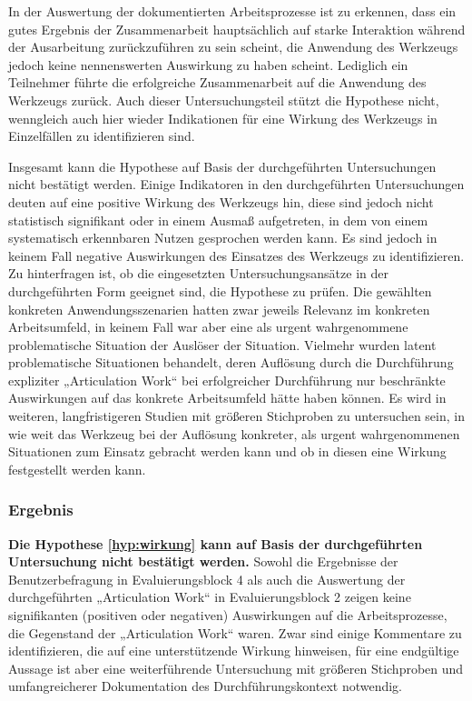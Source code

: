 In der Auswertung der dokumentierten Arbeitsprozesse ist zu erkennen, dass ein gutes Ergebnis der Zusammenarbeit hauptsächlich auf starke Interaktion während der Ausarbeitung zurückzuführen zu sein scheint, die Anwendung des Werkzeugs jedoch keine nennenswerten Auswirkung zu haben scheint. Lediglich ein Teilnehmer führte die erfolgreiche Zusammenarbeit auf die Anwendung des Werkzeugs zurück. Auch dieser Untersuchungsteil stützt die Hypothese nicht, wenngleich auch hier wieder Indikationen für eine Wirkung des Werkzeugs in Einzelfällen zu identifizieren sind.

Insgesamt kann die Hypothese auf Basis der durchgeführten Untersuchungen nicht bestätigt werden. Einige Indikatoren in den durchgeführten Untersuchungen deuten auf eine positive Wirkung des Werkzeugs hin, diese sind jedoch nicht statistisch signifikant oder in einem Ausmaß aufgetreten, in dem von einem systematisch erkennbaren Nutzen gesprochen werden kann. Es sind jedoch in keinem Fall negative Auswirkungen des Einsatzes des Werkzeugs zu identifizieren. Zu hinterfragen ist, ob die eingesetzten Untersuchungsansätze in der durchgeführten Form geeignet sind, die Hypothese zu prüfen. Die gewählten konkreten Anwendungsszenarien hatten zwar jeweils Relevanz im konkreten Arbeitsumfeld, in keinem Fall war aber eine als urgent wahrgenommene problematische Situation der Auslöser der Situation. Vielmehr wurden latent problematische Situationen behandelt, deren Auflösung durch die Durchführung expliziter „Articulation Work“ bei erfolgreicher Durchführung nur beschränkte Auswirkungen auf das konkrete Arbeitsumfeld hätte haben können. Es wird in weiteren, langfristigeren Studien mit größeren Stichproben zu untersuchen sein, in wie weit das Werkzeug bei der Auflösung konkreter, als urgent wahrgenommenen Situationen zum Einsatz gebracht werden kann und ob in diesen eine Wirkung festgestellt werden kann. 

\subsubsection{Ergebnis} 

\textbf{Die Hypothese \ref{hyp:wirkung} kann auf Basis der durchgeführten Untersuchung nicht bestätigt werden.} Sowohl die Ergebnisse der Benutzerbefragung in Evaluierungsblock 4 als auch die Auswertung der durchgeführten „Articulation Work“ in Evaluierungsblock 2 zeigen keine signifikanten (positiven oder negativen) Auswirkungen auf die Arbeitsprozesse, die Gegenstand der „Articulation Work“ waren. Zwar sind einige Kommentare zu identifizieren, die auf eine unterstützende Wirkung hinweisen, für eine endgültige Aussage ist aber eine weiterführende Untersuchung mit größeren Stichproben und umfangreicherer Dokumentation des Durchführungskontext notwendig. 

